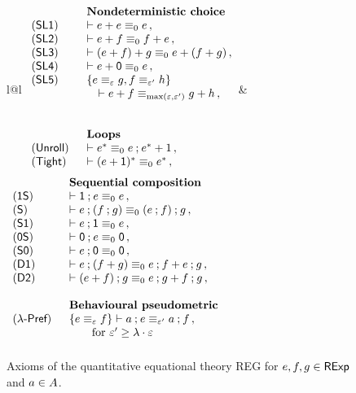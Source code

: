\begin{figure}[h]
	
{
\small
\begin{tabular}{l@{\quad}l}
\(
\begin{array}{ll}
&\textbf{Nondeterministic choice}\\
(\mathsf{SL1})\;\; 
& \vdash e + e \equiv_0 e \,, \\
(\mathsf{SL2})\;\; 
& \vdash e + f \equiv_0 f + e \,, \\
(\mathsf{SL3})\;\; 
& \vdash (e + f) + g\equiv_0 e + (f + g) \,, \\
(\mathsf{SL4})\;\; 
& \vdash e + \mathsf{0}\equiv_0 e \,, \\
(\mathsf{SL5})\;\; & \{ e \equiv_\varepsilon g , f \equiv_{\varepsilon'} h\} \\ & \quad\vdash e + f \equiv_{\max(\varepsilon, \varepsilon')} g + h \,, \\\\\\
&\textbf{Loops} \\
(\mathsf{Unroll})\;\; & \vdash e^\ast \equiv_0 e \mathbin{;} e^{\ast} + 1 \,, \\
(\mathsf{Tight})\;\; & \vdash (e + \mathsf{1})^\ast \equiv_0 e^\ast \,, \\[1.2ex]
\end{array}
\)&
\(
\begin{array}{ll}
&\textbf{Sequential composition}\\
	(\mathsf{1S})\;\; 
& \vdash \mathsf{1} \mathbin{;} e \equiv_0 e \,, \\
(\mathsf{S})\;\; 
& \vdash e \mathbin{;} (f \mathbin{;} g) \equiv_0 (e \mathbin{;} f) \mathbin{;} g \,, \\
(\mathsf{S1})\;\; 
& \vdash e \mathbin{;} \mathsf{1} \equiv_0 e \,, \\
(\mathsf{0S})\;\; 
& \vdash \mathsf{0} \mathbin{;} e \equiv_0 \mathsf{0} \,, \\
(\mathsf{S0})\;\; 
& \vdash e \mathbin{;} \mathsf{0} \equiv_0 \mathsf{0} \,, \\
(\mathsf{D1})\;\; 
& \vdash e \mathbin{;} (f + g) \equiv_0 e \mathbin{;} f + e \mathbin{;} g \,, \\
(\mathsf{D2})\;\; 
& \vdash (e + f) \mathbin{;} g \equiv_0 e \mathbin{;} g + f \mathbin{;} g \,, \\\\
&\textbf{Behavioural pseudometric}\\
(\textsf{$\lambda$-Pref})\;\; & \{ e \equiv_\varepsilon f \} \vdash a \mathbin{;} e \equiv_{\varepsilon'} a \mathbin{;} f \,,\\&\qquad \text{for $\varepsilon'\geq \lambda \cdot \varepsilon$} \\[1.2ex]
\end{array}
\)
\end{tabular}
}	
\caption{Axioms of the quantitative equational theory \textsf{REG} for $e,f,g \in \mathsf{RExp}$ and $a \in {A}$.}
\label{c2:fig:axioms}
\end{figure}

